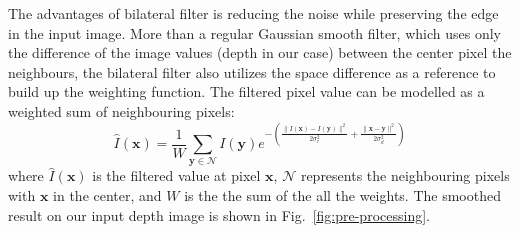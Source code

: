 The advantages of bilateral filter is reducing the noise while preserving the edge in the input image. 
More than a regular Gaussian smooth filter, which uses only the difference of the image values (depth in our case) between the center pixel the neighbours, the bilateral filter also utilizes the space difference as a reference to build up the weighting function.
The filtered pixel value can be modelled as a weighted sum of neighbouring pixels:
\begin{equation}
\hat{I}(\mathbf{x}) = \frac{1}{W}\sum_{\mathbf{y} \in \mathcal{N}} I(\mathbf{y})e^{-(\frac{\lVert I(\mathbf{x}) - I(\mathbf{y})\rVert^2}{2\sigma_r^2} + \frac{\lVert \mathbf{x} - \mathbf{y}\rVert^2}{2\sigma_d^2})}
\end{equation}
where $\hat{I}(\mathbf{x})$ is the filtered value at pixel $\mathbf{x}$, $\mathcal{N}$ represents the neighbouring pixels with $\mathbf{x}$ in the center, and $W$ is the the sum of the all the weights. 
The smoothed result on our input depth image is shown in Fig.~\ref{fig:pre-processing}.

